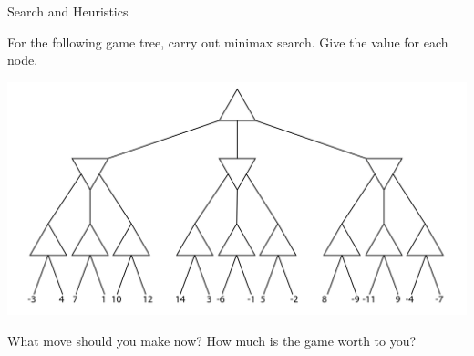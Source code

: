 \documentclass[twoside]{article}
\newcommand{\solutionspace}[4]{\fbox{\begin{minipage}[t][#1][t]{#2} \textbf{#3} 

\solution{}{#4} \end{minipage}}}
\begin{document}
\newpage



\begin{problem} {Search and Heuristics}

\begin{question}[10] For the following game tree, carry out minimax search. Give the value for each node.

\begin{center}
\includegraphics[width=\linewidth]{gametree.png}
\end{center}

\end{question}

\begin{question}[5] What move should you make now? How much is the game worth to you?

\solutionspace{2cm}{15cm}{}
{\Oneb}

\end{question}

\end{problem}
\end{document}
